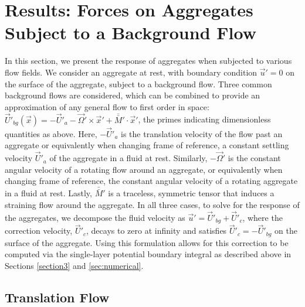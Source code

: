 \section{Results: Forces on Aggregates Subject to a Background Flow} 
\label{sec:results}
In this section, we present the response of aggregates when subjected to various flow fields. We consider an aggregate at rest, with boundary condition $\vec{u}'=0$ on the surface of the aggregate, subject to a background flow. Three common background flows are considered, which can be combined to provide an approximation of any general flow to first order in space: $\vec{U}'_{bg}(\vec{x}) = -\vec{U}'_a - \vec{\Omega}' \times \vec{x}' + \bar{\bar{M}}' \cdot \vec{x}'$, the primes indicating dimensionless quantities as above. Here, $-\vec{U}'_a$ is the translation velocity of the flow past an aggregate or equivalently when changing frame of reference, a constant settling velocity $\vec{U}'_a$ of the aggregate in a fluid at rest.  Similarly, $-\vec{\Omega}'$ is the constant angular velocity of a rotating flow around an aggregate, or equivalently when changing frame of reference, the constant angular velocity of a rotating aggregate in a fluid at rest. Lastly, $\bar{\bar{M}}'$ is a traceless, symmetric tensor that induces a straining flow around the aggregate. In all three cases, to solve for the response of the aggregates, we decompose the fluid velocity as $\vec{u}' = \vec{U}'_{bg} + \vec{U}'_c$, where the correction velocity, $\vec{U}'_c$, decays to zero at infinity and satisfies $\vec{U}'_c = -\vec{U}'_{bg}$ on the surface of the aggregate. 
Using this formulation allows for this correction to be computed via the single-layer potential boundary integral as described above in Sections \ref{section3} and \ref{sec:numerical}.
\subsection{Translation Flow}
\label{sec:results_translationflow}

